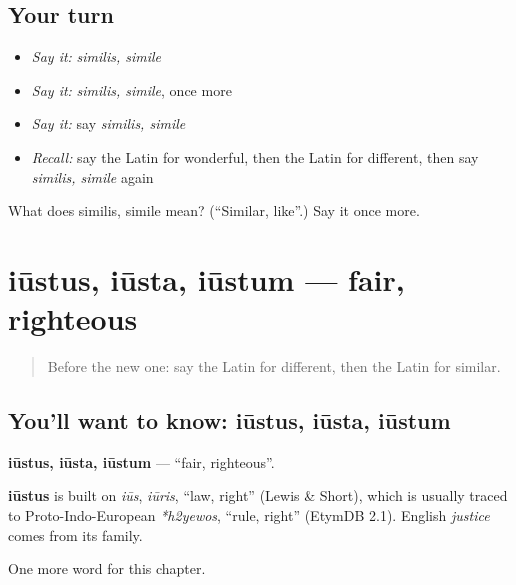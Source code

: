 \subsection*{Your turn}
\begin{itemize}
\raggedright
  \item \emph{Say it:} \emph{similis, simile}
  \item \emph{Say it:} \emph{similis, simile}, once more
  \item \emph{Say it:} say \emph{similis, simile}
  \item \emph{Recall:} say the Latin for wonderful, then the Latin for different, then say \emph{similis, simile} again
\end{itemize}

\begin{tcolorbox}[breakable,colback=teal!4,colframe=teal!35!black,title={Before you move on}]
What does similis, simile mean? (\textquotedblleft{}Similar, like\textquotedblright{}.) Say it once more.
\end{tcolorbox}
\section[iūstus, iūsta, iūstum]{iūstus, iūsta, iūstum — fair, righteous}

\label{lesson:LA-C266-iustus}



\begin{quote}
Before the new one: say the Latin for different, then the Latin for similar.
\end{quote}

\subsection*{You'll want to know: iūstus, iūsta, iūstum}
\textbf{iūstus, iūsta, iūstum} — \textquotedblleft{}fair, righteous\textquotedblright{}.

\begin{cousinweb}
\textbf{iūstus} is built on \emph{iūs}, \emph{iūris}, \textquotedblleft{}law, right\textquotedblright{} (Lewis \& Short), which is usually traced to Proto-Indo-European \emph{*h2yewos}, \textquotedblleft{}rule, right\textquotedblright{} (EtymDB 2.1). English \emph{justice} comes from its family.
\end{cousinweb}

\begin{grammarlens}[title={What you've built}]
One more word for this chapter.
\end{grammarlens}


